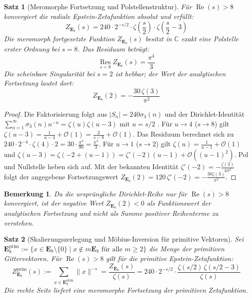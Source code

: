 \documentclass[11pt,a4paper]{article}
\newtheorem{theorem}{Satz}
\newtheorem{remark}{Bemerkung}
\begin{document}
	\begin{theorem}[Meromorphe Fortsetzung und Polstellenstruktur]
		Für $\operatorname{Re}(s) > 8$ konvergiert die radiale Epstein-Zetafunktion absolut und erfüllt:
		$$Z_{\mathbf{E}_8}(s) = 240 \cdot 2^{-s/2} \cdot \zeta\left(\frac{s}{2}\right) \cdot \zeta\left(\frac{s}{2} - 3\right)$$
		Die meromorph fortgesetzte Funktion $Z_{\mathbf{E}_8}(s)$ besitzt in $\mathbb{C}$ exakt eine Polstelle erster Ordnung bei $s = 8$. Das Residuum beträgt:
		$$\operatorname*{Res}_{s=8} Z_{\mathbf{E}_8}(s) = \frac{\pi^4}{3}$$
		Die scheinbare Singularität bei $s = 2$ ist hebbar; der Wert der analytischen Fortsetzung lautet dort:
		$$Z_{\mathbf{E}_8}(2) = -\frac{30\,\zeta(3)}{\pi^2}$$
	\end{theorem}
	
	\begin{proof}
		Die Faktorisierung folgt aus $|S_n| = 240 \sigma_3(n)$ und der Dirichlet-Identität $\sum_{n=1}^\infty \sigma_3(n) n^{-u} = \zeta(u)\zeta(u-3)$ mit $u = s/2$ \cite{apostol1976}.
		Für $u \to 4$ ($s \to 8$) gilt $\zeta(u-3) = \frac{1}{u-4} + \mathcal{O}(1) = \frac{2}{s-8} + \mathcal{O}(1)$. Das Residuum berechnet sich zu $240 \cdot 2^{-4} \cdot \zeta(4) \cdot 2 = 30 \cdot \frac{\pi^4}{90} = \frac{\pi^4}{3}$.
		Für $u \to 1$ ($s \to 2$) gilt $\zeta(u) = \frac{1}{u-1} + \mathcal{O}(1)$ und $\zeta(u-3) = \zeta(-2 + (u-1)) = \zeta'(-2)(u-1) + \mathcal{O}((u-1)^2)$. Pol und Nullstelle heben sich auf. Mit der bekannten Identität $\zeta'(-2) = -\frac{\zeta(3)}{4\pi^2}$ folgt der angegebene Fortsetzungswert $Z_{\mathbf{E}_8}(2) = 120\,\zeta'(-2) = -\frac{30\zeta(3)}{\pi^2}$.
	\end{proof}
	
	\begin{remark}
		Da die ursprüngliche Dirichlet-Reihe nur für $\operatorname{Re}(s) > 8$ konvergiert, ist der negative Wert $Z_{\mathbf{E}_8}(2) < 0$ als Funktionswert der analytischen Fortsetzung und nicht als Summe positiver Reihenterme zu verstehen.
	\end{remark}
	
	\begin{theorem}[Skalierungszerlegung und Möbius-Inversion für primitive Vektoren]
		Sei $\mathbf{E}_8^{\text{prim}} := \{x \in \mathbf{E}_8 \setminus \{0\} \mid x \notin m\mathbf{E}_8 \text{ für alle } m \ge 2\}$ die Menge der primitiven Gittervektoren. Für $\operatorname{Re}(s) > 8$ gilt für die primitive Epstein-Zetafunktion:
		$$Z_{\mathbf{E}_8}^{\text{prim}}(s) := \sum_{x \in \mathbf{E}_8^{\text{prim}}} \|x\|^{-s} = \frac{Z_{\mathbf{E}_8}(s)}{\zeta(s)} = 240 \cdot 2^{-s/2} \cdot \frac{\zeta(s/2)\,\zeta(s/2 - 3)}{\zeta(s)}$$
		Die rechte Seite liefert eine meromorphe Fortsetzung der primitiven Zetafunktion.
	\end{theorem}
	
\end{document}
